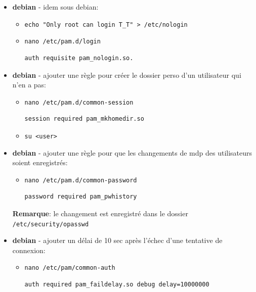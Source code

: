 \documentclass[a4paper]{article}
\begin{document}
\begin{itemize}
\item \textbf{debian} - idem sous debian:
\begin{itemize}
    \item \texttt{echo "Only root can login T\_T" > /etc/nologin}
    \item \texttt{nano /etc/pam.d/login}
\begin{example} \begin{verbatim}
auth requisite pam_nologin.so.
\end{verbatim} \end{example}
\end{itemize}


\item \textbf{debian} - ajouter une règle pour créer le dossier perso d'un utilisateur qui n'en a pas:
\begin{itemize}
    \item \texttt{nano /etc/pam.d/common-session}
\begin{example} \begin{verbatim}
session required pam_mkhomedir.so
\end{verbatim} \end{example}
    \item \texttt{su <user>}
\end{itemize}


\item \textbf{debian} - ajouter une règle pour que les changements de mdp des utilisateurs soient enregistrés:
\begin{itemize}
    \item \texttt{nano /etc/pam.d/common-password}
\begin{example} \begin{verbatim}
password required pam_pwhistory
\end{verbatim} \end{example}
\end{itemize}
\textbf{Remarque}: le changement est enregistré dans le dossier \texttt{/etc/security/opasswd}


\item \textbf{debian} - ajouter un délai de 10 sec après l'échec d'une tentative de connexion:
\begin{itemize}
    \item \texttt{nano /etc/pam/common-auth}
\begin{example} \begin{verbatim}
auth required pam_faildelay.so debug delay=10000000
\end{verbatim} \end{example}
\end{itemize}



\end{itemize}
\end{document}
